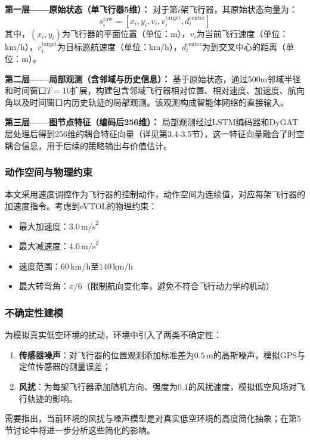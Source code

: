 \documentclass[12pt,a4paper,UTF8]{ctexart}
\begin{document}
\textbf{第一层——原始状态（单飞行器5维）：}
对于第$i$架飞行器，其原始状态向量为：
\begin{equation}
    s_i^{\text{raw}} = [x_i, y_i, v_i, v_i^{\text{target}}, d_i^{\text{center}}]
\end{equation}
其中，$(x_i, y_i)$为飞行器的平面位置（单位：m），$v_i$为当前飞行速度（单位：km/h），$v_i^{\text{target}}$为目标巡航速度（单位：km/h），$d_i^{\text{center}}$为到交叉中心的距离（单位：m）。

\textbf{第二层——局部观测（含邻域与历史信息）：}
基于原始状态，通过500m邻域半径和时间窗口$T=10$扩展，构建包含邻域飞行器相对位置、相对速度、加速度、航向角以及时间窗口内历史轨迹的局部观测。该观测构成智能体网络的直接输入。

\textbf{第三层——图节点特征（编码后256维）：}
局部观测经过LSTM编码器和DyGAT层处理后得到256维的耦合特征向量（详见第3.4-3.5节），这一特征向量融合了时空耦合信息，用于后续的策略输出与价值估计。

\subsubsection{动作空间与物理约束}
本文采用速度调控作为飞行器的控制动作，动作空间为连续值，对应每架飞行器的加速度指令。考虑到eVTOL的物理约束：
\begin{itemize}
    \item 最大加速度：$3.0\,\text{m/s}^2$
    \item 最大减速度：$4.0\,\text{m/s}^2$
    \item 速度范围：$60\,\text{km/h}$至$140\,\text{km/h}$
    \item 最大转弯角：$\pi/6$（限制航向变化率，避免不符合飞行动力学的机动）
\end{itemize}

\subsubsection{不确定性建模}
为模拟真实低空环境的扰动，环境中引入了两类不确定性：
\begin{enumerate}[label=(\arabic*)]
    \item \textbf{传感器噪声}：对飞行器的位置观测添加标准差为$0.5\,\text{m}$的高斯噪声，模拟GPS与定位传感器的测量误差；
    \item \textbf{风扰}：为每架飞行器添加随机方向、强度为$0.1$的风扰速度，模拟低空风场对飞行轨迹的影响。
\end{enumerate}
需要指出，当前环境的风扰与噪声模型是对真实低空环境的高度简化抽象；在第5节讨论中将进一步分析这些简化的影响。
\end{document}
